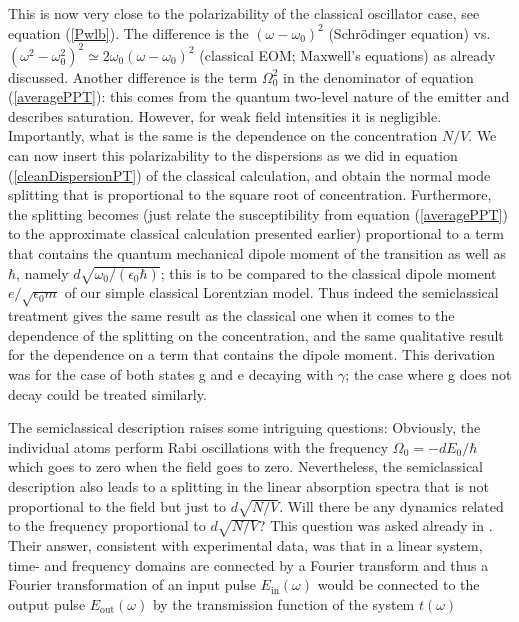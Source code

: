 \documentclass[12pt]{iopart}
\begin{document}
This is now very close to the polarizability of the classical oscillator case, see equation (\ref{Pwlb}). The difference is the $(\omega - \omega_0)^2$ (Schr\"odinger equation) vs. $(\omega^2 - \omega_0^2)^2 \simeq 2 \omega_0 (\omega - \omega_0)^2$ (classical EOM; Maxwell's equations) as already discussed. Another difference is the term $\Omega_0^2$ in the denominator of equation (\ref{averagePPT}): this comes from the quantum two-level nature of the emitter and describes saturation. However, for weak field intensities it is negligible. Importantly, what is the same is the dependence on the concentration $N/V$. We can now insert this polarizability to the dispersions as we did in equation (\ref{cleanDispersionPT}) of the classical calculation, and obtain the normal mode splitting that is proportional to the square root of concentration. Furthermore, the splitting becomes (just relate the susceptibility from equation (\ref{averagePPT}) to the approximate classical calculation presented earlier) proportional to a term that contains the quantum mechanical dipole moment of the transition as well as $\hbar$, namely $d \sqrt{\omega_0/(\epsilon_0\hbar)}$; this is to be compared to the classical dipole moment $e/\sqrt{\epsilon_0 m}$ of our simple classical Lorentzian model. Thus indeed the semiclassical treatment gives the same result as the classical one when it comes to the dependence of the splitting on the concentration, and the same qualitative result for the dependence on a term that contains the dipole moment. This derivation was for the case of both states g and e decaying with $\gamma$; the case where g does not decay could be treated similarly. 

The semiclassical description raises some intriguing questions: Obviously, the individual atoms perform Rabi oscillations with the frequency $\Omega_0 = -d E_0/\hbar$ which goes to zero when the field goes to zero. Nevertheless, the semiclassical description also leads to a splitting 
in the linear absorption spectra that is not proportional to the field but just to $d \sqrt{N/V}$. Will there be any 
dynamics related to the frequency proportional to $d \sqrt{N/V}$? This question was asked already in \cite{Zhu1990}. Their answer, consistent with experimental data, was that in a linear system, time- and frequency domains are connected by a Fourier transform and thus a Fourier transformation of an input pulse $E_{\mathrm{in}}(\omega)$ would be connected to the output pulse $E_{\mathrm{out}}(\omega)$ by the transmission function of the system $t(\omega)$
\end{document}
